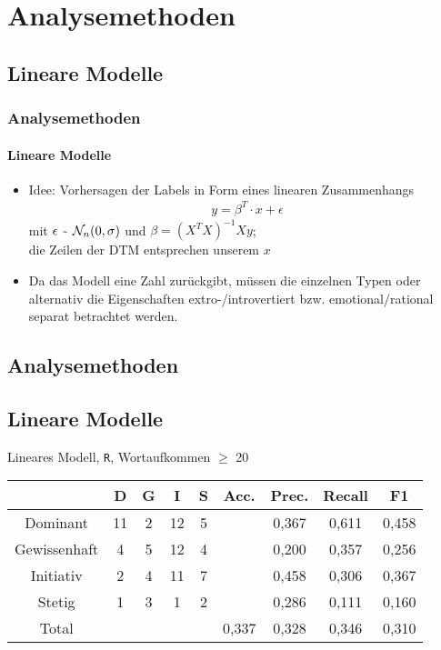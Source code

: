 \section{Analysemethoden}
\subsection{Lineare Modelle}
\begin{frame}
\frametitle{Analysemethoden}
\framesubtitle{Lineare Modelle}
\begin{itemize}\itemsep12pt
\item Idee: Vorhersagen der Labels in Form eines linearen Zusammenhangs 
\begin{align*}
y=\beta^T\cdot x+\epsilon
\end{align*}
mit $\epsilon~\raisebox{-0.9ex}{\~{ }} ~ \mathcal{N}_{n}(0,\sigma)$ und $\beta=(X^TX)^{-1}Xy$;\\
die Zeilen der DTM entsprechen unserem $x$ 
\item Da das Modell eine Zahl zurückgibt, müssen die einzelnen Typen oder alternativ die Eigenschaften extro-/introvertiert bzw. emotional/rational separat betrachtet werden.
\end{itemize}
\end{frame}

\begin{frame}
\section{Analysemethoden}
\subsection{Lineare Modelle}
Lineares Modell, \texttt{R}, Wortaufkommen $\geq$ 20\\
\vspace{12pt}
\begin{tabular}{|c|c|c|c|c|c|c|c|c|}
\hline
				& D 	& G	& I & S	& Acc.	& Prec. & Recall	& F1\\
\hline
Dominant 		& 11	& 2 & 12& 5 &      	& 0,367 & 0,611 	& 0,458\\
Gewissenhaft 	& 4 	& 5 & 12& 4 & 		& 0,200 & 0,357 	& 0,256\\
Initiativ 		& 2 	& 4	& 11& 7	& 		& 0,458	& 0,306 	& 0,367\\
Stetig 			& 1 	& 3 & 1 & 2 & 		& 0,286	& 0,111 	& 0,160\\
\hline
Total 			& 		& 	& 	& 	& 0,337	& 0,328 & 0,346  	& 0,310\\
\hline
\end{tabular}
\end{frame}


